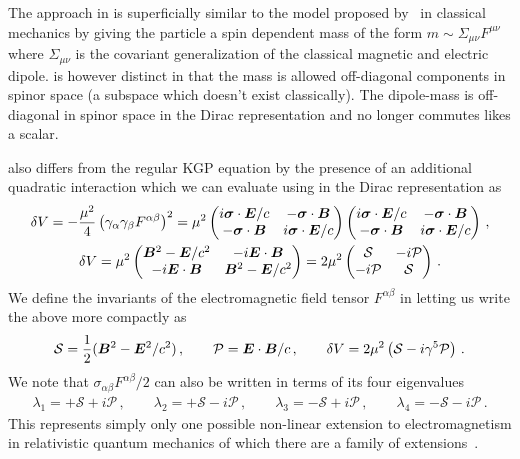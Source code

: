 The approach in  is superficially similar to the model proposed by~\cite{Frenkel:1926zz} in classical mechanics by giving the particle a spin dependent mass of the form $m\sim\Sigma_{\mu\nu}F^{\mu\nu}$ where $\Sigma_{\mu\nu}$ is the covariant generalization of the classical magnetic and electric dipole.  is however distinct in that the mass is allowed off-diagonal components in spinor space (a subspace which doesn't exist classically). The dipole-mass  is off-diagonal in spinor space in the Dirac representation and no longer commutes likes a scalar.

 also differs from the regular KGP equation by the presence of an additional quadratic interaction which we can evaluate using  in the Dirac representation as
\begin{gather}
    \label{quad:1} \delta V=-\frac{\mu^{2}}{4}\left(\gamma_{\alpha}\gamma_{\beta}F^{\alpha\beta}\right)^{2}=\mu^{2}
    \begin{pmatrix}
        i\boldsymbol{\sigma}\cdot\boldsymbol{E}/c & -\boldsymbol{\sigma}\cdot\boldsymbol{B} \\
        -\boldsymbol{\sigma}\cdot\boldsymbol{B} & i\boldsymbol{\sigma}\cdot\boldsymbol{E}/c
    \end{pmatrix}
    \begin{pmatrix}
        i\boldsymbol{\sigma}\cdot\boldsymbol{E}/c & -\boldsymbol{\sigma}\cdot\boldsymbol{B} \\
        -\boldsymbol{\sigma}\cdot\boldsymbol{B} & i\boldsymbol{\sigma}\cdot\boldsymbol{E}/c
    \end{pmatrix}\,,\\
    \label{quad:2}
    \delta V = \mu^{2}
    \begin{pmatrix}
        \boldsymbol{B}^{2}-\boldsymbol{E}/c^{2} & -i\boldsymbol{E}\cdot\boldsymbol{B} \\
        -i\boldsymbol{E}\cdot\boldsymbol{B} & \boldsymbol{B}^{2}-\boldsymbol{E}/c^{2}
    \end{pmatrix}=2\mu^{2}
    \begin{pmatrix}
        \mathcal{S} & -i\mathcal{P} \\
        -i\mathcal{P} & \mathcal{S}
    \end{pmatrix}\,.
\end{gather}
We define the invariants of the electromagnetic field tensor $F^{\alpha\beta}$ in   letting us write the above more compactly as
\begin{alignat}{1}
    \label{inv:1} \mathcal{S}=\frac{1}{2}(\boldsymbol{B}^{2}-\boldsymbol{E}^{2}/c^{2})\,,\qquad
    \mathcal{P}=\boldsymbol{E}\cdot\boldsymbol{B}/c\,,\qquad
    \delta V=2\mu^{2}\left(\mathcal{S}-i\gamma^{5}\mathcal{P}\right)\,.
\end{alignat}
We note that $\sigma_{\alpha\beta}F^{\alpha\beta}/2$ can also be written in terms of its four eigenvalues
\begin{align}
    \label{inv:2}
    \lambda_{1}=+\mathcal{S}+i\mathcal{P}\,,\qquad
    \lambda_{2}=+\mathcal{S}-i\mathcal{P}\,,\qquad
    \lambda_{3}=-\mathcal{S}+i\mathcal{P}\,,\qquad
    \lambda_{4}=-\mathcal{S}-i\mathcal{P}\,.
\end{align}
This represents simply only one possible non-linear extension to electromagnetism in relativistic quantum mechanics of which there are a family of extensions~\citep{Foldy:1952a}.

